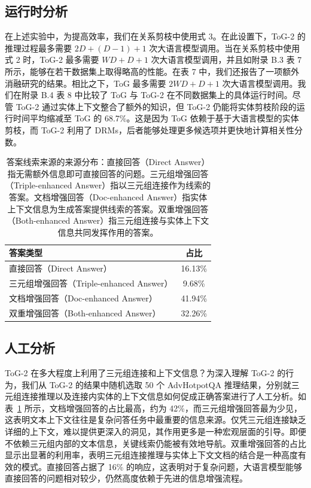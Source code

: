 \documentclass[11pt,UTF8,fontset=fandol]{ctexart}
\newcommand{\toctwo}{ToG-2}
\begin{document}
\subsection{运行时分析}

在上述实验中，为提高效率，我们在关系剪枝中使用式 3。在此设置下，\toctwo{} 的推理过程最多需要 $2D+(D-1)+1$ 次大语言模型调用。当在关系剪枝中使用式 2 时，\toctwo{} 最多需要 $WD+D+1$ 次大语言模型调用，并且如附录 B.3 表 7 所示，能够在若干数据集上取得略高的性能。在表 7 中，我们还报告了一项额外消融研究的结果。相比之下，ToG 最多需要 $2WD+D+1$ 次大语言模型调用。我们在附录 B.4 表 8 中比较了 ToG 与 \toctwo{} 在不同数据集上的具体运行时间。尽管 \toctwo{} 通过实体上下文整合了额外的知识，但 \toctwo{} 仍能将实体剪枝阶段的运行时间平均缩减至 ToG 的 68.7\%。这是因为 ToG 依赖于基于大语言模型的实体剪枝，而 \toctwo{} 利用了 DRMs，后者能够处理更多候选项并更快地计算相关性分数。

\begin{table}[H]\centering
\caption{答案线索来源的来源分布：直接回答（Direct Answer）指无需额外信息即可直接回答的问题。三元组增强回答（Triple-enhanced Answer）指以三元组连接作为线索的答案。文档增强回答（Doc-enhanced Answer）指实体上下文信息为生成答案提供线索的答案。双重增强回答（Both-enhanced Answer）指三元组连接与实体上下文信息共同发挥作用的答案。}
\begin{tabular}{lc}
\toprule
答案类型 & 占比\\
\midrule
直接回答（Direct Answer） & 16.13\%\\
三元组增强回答（Triple-enhanced Answer） & 9.68\%\\
文档增强回答（Doc-enhanced Answer） & 41.94\%\\
双重增强回答（Both-enhanced Answer） & 32.26\%\\
\bottomrule
\end{tabular}
\label{tab:4}
\end{table}

\subsection{人工分析}

\toctwo{} 在多大程度上利用了三元组连接和上下文信息？为深入理解 \toctwo{} 的行为，我们从 \toctwo{} 的结果中随机选取 50 个 AdvHotpotQA 推理结果，分别就三元组连接推理以及连接内实体的上下文信息如何促成正确答案进行了人工分析。如表~\ref{tab:4} 所示，文档增强回答的占比最高，约为 42\%，而三元组增强回答最为少见，这表明文本上下文往往是复杂问答任务中最重要的信息来源。仅凭三元组连接缺乏详细的上下文，难以提供更深入的洞见，其作用更多是一种宏观层面的引导。即便不依赖三元组内部的文本信息，关键线索仍能被有效地导航。双重增强回答的占比显示出显著的利用率，表明三元组连接推理与实体上下文文档的结合是一种高度有效的模式。直接回答占据了 16\% 的响应，这表明对于复杂问题，大语言模型能够直接回答的问题相对较少，仍然高度依赖于先进的信息增强流程。
\end{document}
